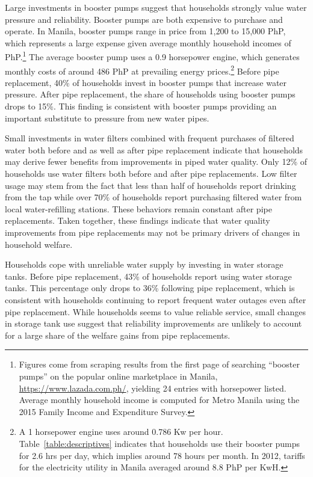 \documentclass[12pt,table]{article}
\begin{document}
Large investments in booster pumps suggest that households strongly value water pressure and reliability.  Booster pumps are both expensive to purchase and operate. In Manila, booster pumps range in price from 1,200 to 15,000 PhP, which represents a large expense given average monthly household incomes of PhP.\footnote{Figures come from scraping results from the first page of searching ``booster pumps'' on the popular online marketplace in Manila, \url{https://www.lazada.com.ph/},  yielding 24 entries with horsepower listed.  Average monthly household income is computed for Metro Manila using the 2015 Family Income and Expenditure Survey.}  The average booster pump uses a 0.9 horsepower engine, which generates monthly costs of around 486 PhP at prevailing energy prices.\footnote{A 1 horsepower engine uses around 0.786 Kw per hour.  Table~\ref{table:descriptives} indicates that households use their booster pumps for 2.6 hrs per day, which implies around 78 hours per month.  In 2012, tariffs for the electricity utility in Manila averaged around 8.8 PhP per KwH.}   Before pipe replacement, 40\% of households invest in booster pumps that increase water pressure.  After pipe replacement, the share of households using booster pumps drops to 15\%.  This finding is consistent with booster pumps providing an important substitute to pressure from new water pipes.

Small investments in water filters combined with frequent purchases of filtered water both before and as well as after pipe replacement indicate that households may derive fewer benefits from improvements in piped water quality.  Only 12\% of households use water filters both before and after pipe replacements.  Low filter usage may stem from the fact that less than half of households report drinking from the tap while over 70\% of households report purchasing filtered water from local water-refilling stations.  These behaviors remain constant after pipe replacements.  Taken together, these findings indicate that water quality improvements from pipe replacements may not be primary drivers of changes in household welfare.

Households cope with unreliable water supply by investing in water storage tanks.  Before pipe replacement, 43\% of households report using water storage tanks.  This percentage only drops to 36\% following pipe replacement, which is consistent with households continuing to report frequent water outages even after pipe replacement.  While households seems to value reliable service, small changes in storage tank use suggest that reliability improvements are unlikely to account for a large share of the welfare gains from pipe replacements.
\end{document}
